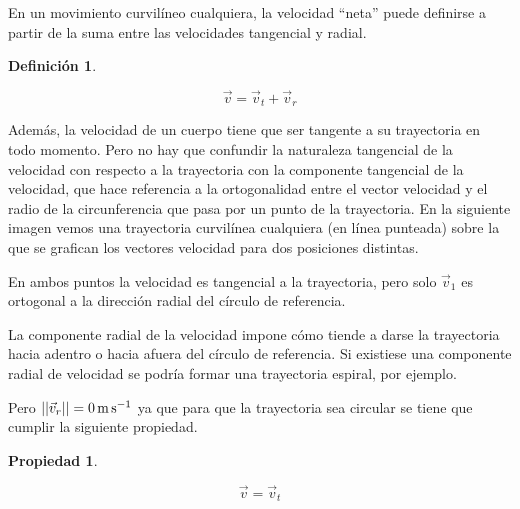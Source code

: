\documentclass[a5paper,12pt,twoside]{book}
\newtheorem{defn}{{Definición}}[chapter]
\newtheorem{prop}{{Propiedad}}[chapter]
\begin{document}
En un movimiento curvilíneo cualquiera, la velocidad ``neta'' puede definirse a partir de la suma entre las velocidades tangencial y radial.

\begin{mdframed}[style=MyFrame1]
    \begin{defn}
    \end{defn}
    \begin{equation*}
        \Vec{v} = \Vec{v}_t + \Vec{v}_r
    \end{equation*}
\end{mdframed}

Además, la velocidad de un cuerpo tiene que ser tangente a su trayectoria en todo momento.
Pero no hay que confundir la naturaleza tangencial de la velocidad con respecto a la trayectoria con la componente tangencial de la velocidad, que hace referencia a la ortogonalidad entre el vector velocidad y el radio de la circunferencia que pasa por un punto de la trayectoria.
En la siguiente imagen vemos una trayectoria curvilínea cualquiera (en línea punteada) sobre la que se grafican los vectores velocidad para dos posiciones distintas.

\begin{center}
    \def\svgwidth{\linewidth}
    
\end{center}

En ambos puntos la velocidad es tangencial a la trayectoria, pero solo $\vec{v}_1$ es ortogonal a la dirección radial del círculo de referencia.

La componente radial de la velocidad impone cómo tiende a darse la trayectoria hacia adentro o hacia afuera del círculo de referencia.
Si existiese una componente radial de velocidad se podría formar una trayectoria espiral, por ejemplo.

Pero ${\left|\left| {\Vec{v}_r} \right|\right|} = \SI{0}{\metre\per\second}$ ya que para que la trayectoria sea circular se tiene que cumplir la siguiente propiedad.

\begin{mdframed}[style=MyFrame1]
    \begin{prop}
        \label{prop:circularMovVel}
    \end{prop}
    \begin{equation*}
        \Vec{v} = \Vec{v}_t
    \end{equation*}
\end{mdframed}
\end{document}
